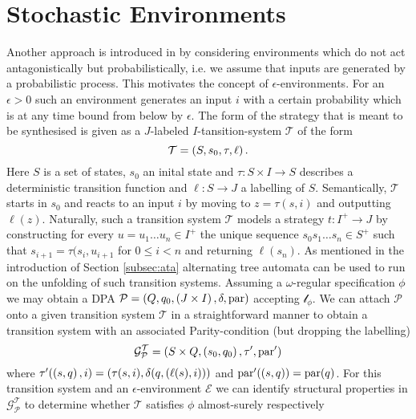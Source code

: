 \section{Stochastic Environments}
Another approach is introduced in \cite{SynProbEnv} by considering environments
which do not act antagonistically but probabilistically, i.e. we assume that 
inputs are generated by a probabilistic process. This motivates the concept of 
$\epsilon$-environments. For an $\epsilon > 0$ such an environment generates an
input $i$ with a certain probability which is at any time bound from below by 
$\epsilon$. The form of the strategy that is meant to be synthesised is given
as a $J$-labeled $I$-tansition-system $\mathcal{T}$ of the form
\begin{equation*}
  \mathcal{T} = \left(S, s_{0}, \tau, \ell\right).
\end{equation*}
Here $S$ is a set of states, $s_{0}$ an inital state and 
$\tau:S\times I\rightarrow S$ describes a deterministic transition function and
$\ell:S\rightarrow J$ a labelling of $S$. Semantically, $\mathcal{T}$ starts in 
$s_{0}$ and reacts to an input $i$ by moving to $z = \tau(s,i)$ and outputting 
$\ell(z)$. Naturally, such a transition system $\mathcal{T}$ models a strategy 
$t:I^{+}\rightarrow J$ by constructing for every 
$u = u_{1}\dots u_{n}\in I^{+}$ the unique sequence 
$s_{0}s_{1}\dots s_{n}\in S^{+}$ such that $s_{i+1} = \tau(s_{i}, u_{i+1}$ for 
$0\leq i<n$ and returning $\ell(s_{n})$. As mentioned in the introduction of 
Section \ref{subsec:ata} alternating tree automata can be used to run on the 
unfolding of such transition systems. Assuming a $\omega$-regular specification 
$\phi$ we may obtain a \ac{DPA} 
$\mathcal{P} = \left(Q, q_{0}, \left(J\times I\right), \delta, \operatorname{par}\right)$ accepting 
$\mathcal{l}_{\phi}$. We can attach $\mathcal{P}$ onto a given transition 
system $\mathcal{T}$ in a straightforward manner to obtain a transition system 
with an associated Parity-condition (but dropping the labelling)
\begin{equation*}
  \mathcal{G}_{\mathcal{P}}^{\mathcal{T}} = \left(S\times Q, 
    \left(s_{0}, q_{0}\right), \tau', \operatorname{par}'\right)
\end{equation*}
where $\tau'(\left(s, q\right), i) = \left(\tau(s, i), 
\delta(q, \left(\ell(s), i\right))\right)$ and $\operatorname{par}'(\left(s, q\right)) = \operatorname{par}(q)$. For
this transition system and an $\epsilon$-environment $\mathcal{E}$ we can 
identify structural properties in $\mathcal{G}_{\mathcal{P}}^{\mathcal{T}}$ to
determine whether $\mathcal{T}$ satisfies $\phi$ almost-surely respectively 
